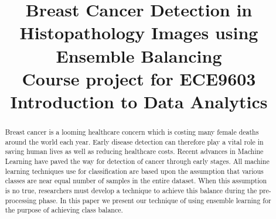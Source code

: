 \documentclass[conference]{IEEEtran}
\begin{document}


\title{Breast Cancer Detection in Histopathology Images using Ensemble Balancing\\
  {\footnotesize Course project for ECE9603 Introduction to Data Analytics}
}

\author{
\and
\and
\and
\and
}

\maketitle

\begin{abstract}
  Breast cancer is a looming healthcare concern which is costing many female
  deaths around the world each year. Early disease detection can therefore play
  a vital role in saving human lives as well as reducing healthcare costs.
  Recent advances in Machine Learning have paved the way for detection of cancer
  through early stages. All machine learning techniques use for classification
  are based upon the assumption that various classes are near equal number of
  samples in the entire dataset. When this assumption is no true, researchers
  must develop a technique to achieve this balance during the pre-processing
  phase. In this paper we present our technique of using ensemble learning for
  the purpose of achieving class balance.
\end{abstract}
\end{document}
